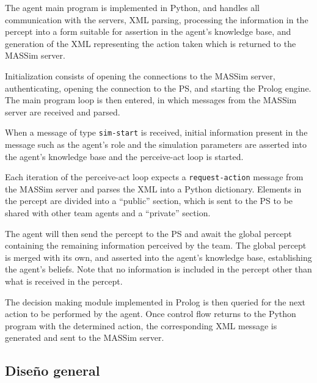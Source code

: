     The agent main program is implemented in Python, and handles all
    communication with the servers, XML parsing, processing the information in
    the percept into a form suitable for assertion in the agent's knowledge
    base, and generation of the XML representing the action taken which is
    returned to the MASSim server.

    Initialization consists of opening the connections to the MASSim server,
    authenticating, opening the connection to the PS, and starting
    the Prolog engine. The main program loop is then entered, in which messages
    from the MASSim server are received and parsed. 

    When a message of type \texttt{sim-start} is received, initial information
    present in the message such as the agent's role and the simulation
    parameters are asserted into the agent's knowledge base and the perceive-act
    loop is started.

    Each iteration of the perceive-act loop expects a \texttt{request-action}
    message from the MASSim server and parses the XML into a Python dictionary.
    Elements in the percept are divided into a ``public'' section, which is sent
    to the PS to be shared with other team agents and a ``private''
    section.

    The agent will then send the percept to the PS and await the global percept
    containing the remaining information perceived by the team. The global
    percept is merged with its own, and asserted into the agent's knowledge
    base, establishing the agent's beliefs.  Note that no information is
    included in the percept other than what is received in the percept.

    The decision making module implemented in Prolog is then queried for the
    next action to be performed by the agent.  Once control flow returns to the
    Python program with the determined action, the corresponding XML message is
    generated and sent to the MASSim server. 

\subsection{Diseño general}
\label{sub:diseno_general}
  
  
